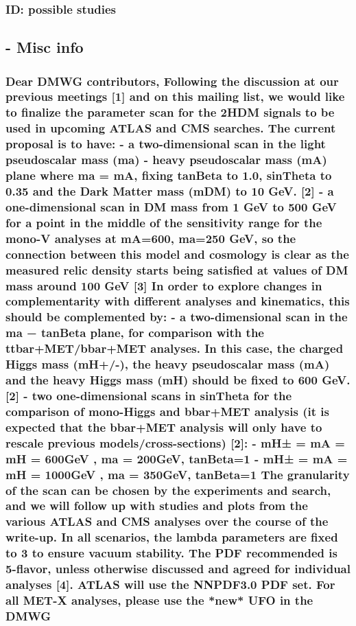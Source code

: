 \subsubsection{ID: possible studies}



\subsection{- Misc info}

\subsubsection{Dear DMWG contributors, Following the discussion at our
previous meetings {[}1{]} and on this mailing list, we would like to
finalize the parameter scan for the 2HDM signals to be used in upcoming
ATLAS and CMS searches. The current proposal is to have: - a
two-dimensional scan in the light pseudoscalar mass (ma) - heavy
pseudoscalar mass (mA) plane where ma = mA, fixing tanBeta to 1.0,
sinTheta to 0.35 and the Dark Matter mass (mDM) to 10 GeV. {[}2{]} - a
one-dimensional scan in DM mass from 1 GeV to 500 GeV for a point in the
middle of the sensitivity range for the mono-V analyses at mA=600,
ma=250 GeV, so the connection between this model and cosmology is clear
as the measured relic density starts being satisfied at values of DM
mass around 100 GeV {[}3{]} In order to explore changes in
complementarity with different analyses and kinematics, this should be
complemented by: - a two-dimensional scan in the ma − tanBeta plane, for
comparison with the ttbar+MET/bbar+MET analyses. In this case, the
charged Higgs mass (mH+/-), the heavy pseudoscalar mass (mA) and the
heavy Higgs mass (mH) should be fixed to 600 GeV. {[}2{]} - two
one-dimensional scans in sinTheta for the comparison of mono-Higgs and
bbar+MET analysis (it is expected that the bbar+MET analysis will only
have to rescale previous models/cross-sections) {[}2{]}: - mH± = mA = mH
= 600GeV , ma = 200GeV, tanBeta=1 - mH± = mA = mH = 1000GeV , ma =
350GeV, tanBeta=1 The granularity of the scan can be chosen by the
experiments and search, and we will follow up with studies and plots
from the various ATLAS and CMS analyses over the course of the write-up.
In all scenarios, the lambda parameters are fixed to 3 to ensure vacuum
stability. The PDF recommended is 5-flavor, unless otherwise discussed
and agreed for individual analyses {[}4{]}. ATLAS will use the NNPDF3.0
PDF set. For all MET-X analyses, please use the *new* UFO in the DMWG
}
